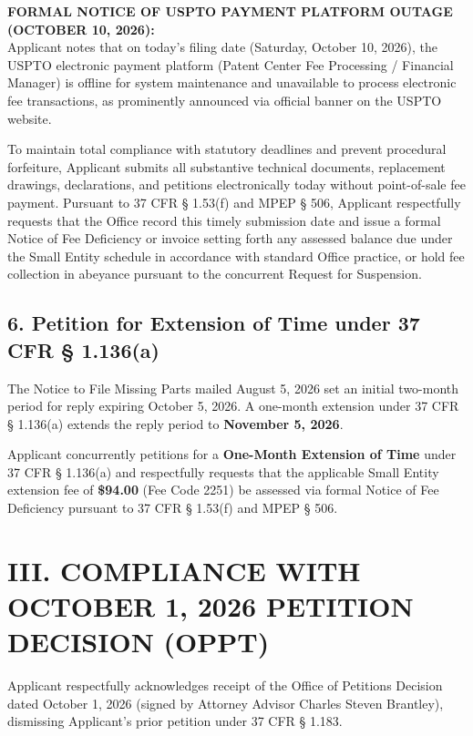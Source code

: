 \documentclass[11pt,letterpaper]{article}
\begin{document}
\textbf{FORMAL NOTICE OF USPTO PAYMENT PLATFORM OUTAGE (OCTOBER 10, 2026):} \\
Applicant notes that on today's filing date (Saturday, October 10, 2026), the USPTO electronic payment platform (Patent Center Fee Processing / Financial Manager) is offline for system maintenance and unavailable to process electronic fee transactions, as prominently announced via official banner on the USPTO website. 

To maintain total compliance with statutory deadlines and prevent procedural forfeiture, Applicant submits all substantive technical documents, replacement drawings, declarations, and petitions electronically today without point-of-sale fee payment. Pursuant to 37 CFR \S{} 1.53(f) and MPEP \S{} 506, Applicant respectfully requests that the Office record this timely submission date and issue a formal Notice of Fee Deficiency or invoice setting forth any assessed balance due under the Small Entity schedule in accordance with standard Office practice, or hold fee collection in abeyance pursuant to the concurrent Request for Suspension.

\subsection*{6. Petition for Extension of Time under 37 CFR \S{} 1.136(a)}

The Notice to File Missing Parts mailed August 5, 2026 set an initial two-month period for reply expiring October 5, 2026. A one-month extension under 37 CFR \S{} 1.136(a) extends the reply period to \textbf{November 5, 2026}. 

Applicant concurrently petitions for a \textbf{One-Month Extension of Time} under 37 CFR \S{} 1.136(a) and respectfully requests that the applicable Small Entity extension fee of \textbf{\$94.00} (Fee Code 2251) be assessed via formal Notice of Fee Deficiency pursuant to 37 CFR \S{} 1.53(f) and MPEP \S{} 506.

\newpage

\section*{III. COMPLIANCE WITH OCTOBER 1, 2026 PETITION DECISION (OPPT)}

Applicant respectfully acknowledges receipt of the Office of Petitions Decision dated October 1, 2026 (signed by Attorney Advisor Charles Steven Brantley), dismissing Applicant's prior petition under 37 CFR \S{} 1.183.
\end{document}
